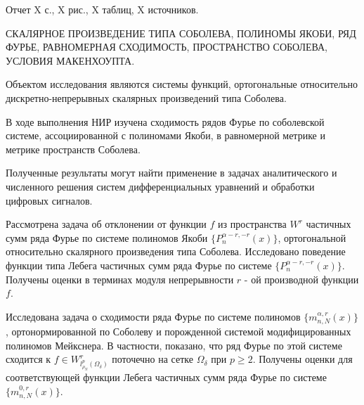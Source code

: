 \Referat %

Отчет X с., X рис., X таблиц, X источников.

\MakeUppercase{скалярное произведение типа Соболева, полиномы Якоби, ряд Фурье, равномерная сходимость, пространство Соболева, условия Макенхоупта.}

Объектом исследования являются системы функций, ортогональные относительно дискретно-непрерывных скалярных произведений типа Соболева.

В ходе выполнения НИР изучена сходимость рядов Фурье по соболевской системе, ассоциированной с полиномами Якоби, в равномерной метрике и метрике пространств Соболева.

Полученные результаты могут найти применение в задачах аналитического и численного решения систем дифференциальных уравнений и обработки цифровых сигналов.

Рассмотрена задача об отклонении от функции $f$ из пространства $W^r$ частичных сумм ряда Фурье по системе полиномов Якоби $\{P_n^{\alpha-r,-r}(x)\}$, ортогональной относительно скалярного произведения типа Соболева. Исследовано поведение функции типа Лебега частичных сумм ряда Фурье по системе $\{P_n^{\alpha-r,-r}(x)\}$. Получены оценки в терминах модуля непрерывности $r$ - ой производной функции $f$.

Исследована задача о сходимости ряда Фурье по системе полиномов $\{m_{n,N}^{\alpha,r}(x)\}$, ортонормированной по Соболеву и порожденной системой модифицированных полиномов Мейкснера. В частности, показано, что ряд Фурье по этой системе сходится к $f\in W^r_{l^p_{\rho_N}(\Omega_\delta)}$ поточечно на сетке $\Omega_\delta$ при $p\ge2$. Получены оценки для соответствующей функции Лебега частичных сумм ряда Фурье по системе $\{m_{n,N}^{0,r}(x)\}$. 